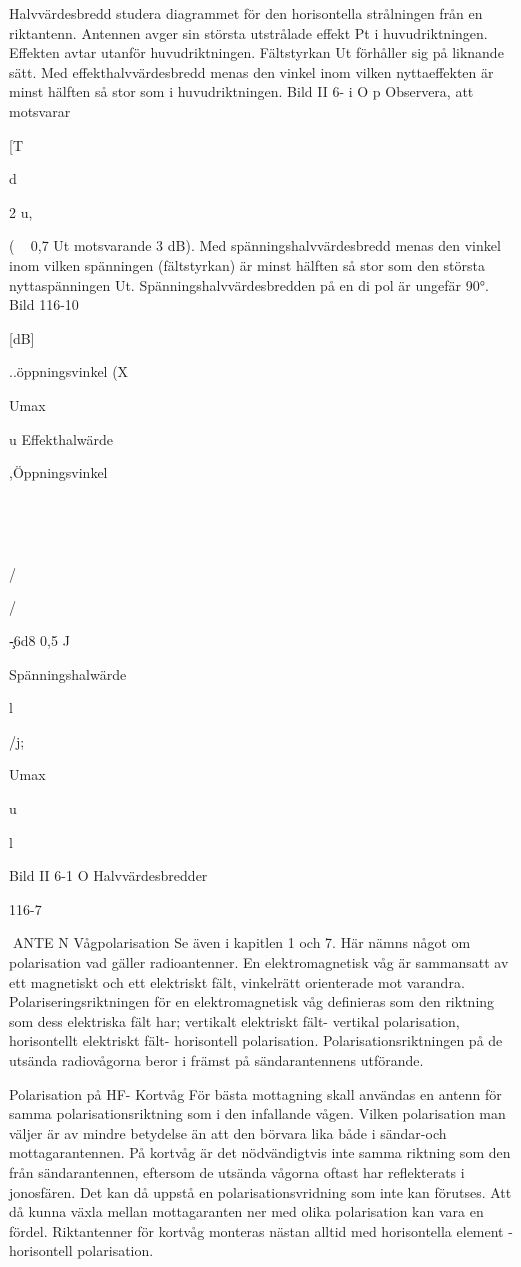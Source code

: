 {Halvvärdesbredd
studera diagrammet för den horisontella
strålningen från en riktantenn.
Antennen avger sin största utstrålade
effekt Pt i huvudriktningen. Effekten avtar
utanför huvudriktningen. Fältstyrkan Ut förhåller sig på liknande sätt.
Med effekthalvvärdesbredd menas den
vinkel inom vilken nyttaeffekten är minst
hälften så stor som i huvudriktningen.
Bild II 6- i O
p
Observera, att
motsvarar ~

[T

d

2 u,

( ~ 0,7 Ut motsvarande 3 dB).
Med spänningshalvvärdesbredd menas
den vinkel inom vilken spänningen (fältstyrkan) är minst hälften så stor som den
största nyttaspänningen Ut. Spänningshalvvärdesbredden på en di pol är ungefär 90°.
Bild 116-10

[dB]

..öppningsvinkel (X

Umax

u
Effekthalwärde

,Öppningsvinkel

\

\

/

/

\c-6d8
0,5
J

Spänningshalwärde

l

/j;

Umax

u

l

Bild II 6-1 O Halvvärdesbredder

116-7

ANTE N
Vågpolarisation
Se även i kapitlen 1 och 7. Här nämns något
om polarisation vad gäller radioantenner.
En elektromagnetisk våg är sammansatt
av ett magnetiskt och ett elektriskt fält, vinkelrätt orienterade mot varandra.
Polariseringsriktningen för en elektromagnetisk våg definieras som den riktning
som dess elektriska fält har;
vertikalt elektriskt fält- vertikal polarisation,
horisontellt elektriskt fält- horisontell polarisation.
Polarisationsriktningen på de utsända
radiovågorna beror i främst på sändarantennens utförande.

Polarisation på HF- Kortvåg
För bästa mottagning skall användas en
antenn för samma polarisationsriktning som
i den infallande vågen. Vilken polarisation
man väljer är av mindre betydelse än att den
börvara lika både i sändar-och mottagarantennen. På kortvåg är det nödvändigtvis inte
samma riktning som den från sändarantennen, eftersom de utsända vågorna oftast
har reflekterats i jonosfären. Det kan då
uppstå en polarisationsvridning som inte
kan förutses. Att då kunna växla mellan
mottagaranten ner med olika polarisation kan
vara en fördel. Riktantenner för kortvåg monteras nästan alltid med horisontella element
-horisontell polarisation.

}
